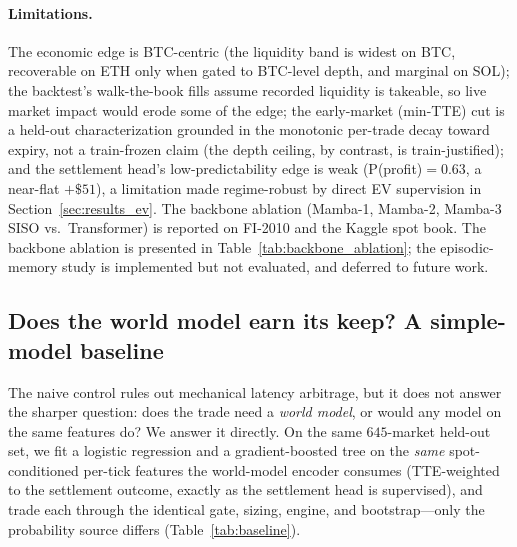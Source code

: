 \documentclass{article}
\begin{document}
\paragraph{Limitations.}
The economic edge is BTC-centric (the liquidity band is widest on BTC,
recoverable on ETH only when gated to BTC-level depth, and marginal on
SOL); the backtest's walk-the-book fills assume recorded liquidity is
takeable, so live market impact would erode some of the edge; the
early-market (min-TTE) cut is a held-out characterization grounded in the
monotonic per-trade decay toward expiry, not a train-frozen claim (the
depth ceiling, by contrast, is train-justified); and the settlement head's
low-predictability edge is weak (P(profit)$=0.63$, a near-flat $+\$51$), a
limitation made regime-robust by direct EV supervision in
Section~\ref{sec:results_ev}.  The backbone ablation
(Mamba-1, Mamba-2, Mamba-3 SISO vs.\ Transformer) is reported on FI-2010
and the Kaggle spot book.  The backbone ablation is presented in
Table~\ref{tab:backbone_ablation}; the episodic-memory study is
implemented but not evaluated, and deferred to future work.

\subsection{Does the world model earn its keep? A simple-model baseline}\label{sec:results_baseline}

The naive control rules out mechanical latency arbitrage, but it does not
answer the sharper question: does the trade need a \emph{world model}, or
would any model on the same features do?  We answer it directly.  On the same
$645$-market held-out set, we fit a logistic regression and a gradient-boosted
tree on the \emph{same} spot-conditioned per-tick features the world-model
encoder consumes (TTE-weighted to the settlement outcome, exactly as the
settlement head is supervised), and trade each through the identical gate,
sizing, engine, and bootstrap---only the probability source differs
(Table~\ref{tab:baseline}).
\end{document}
